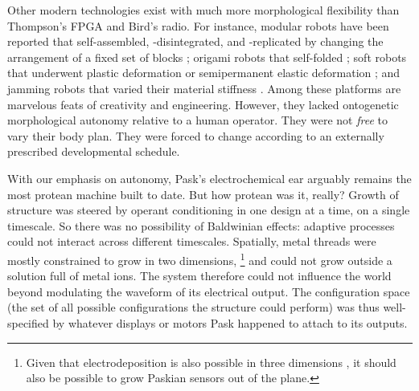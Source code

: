 Other modern technologies exist with much more 
morphological
flexibility
than Thompson's FPGA and Bird's radio.
For instance,
modular robots have been reported that self-assembled, -disintegrated, and -replicated by changing the arrangement of a fixed set of blocks \cite{zykov2005robotics,romanishin20153d,li2019particle,white2005three};
origami robots that self-folded
\cite{hawkes2010programmable,felton2014method,miyashita2017robotic,gladman2016biomimetic};
soft robots that underwent plastic deformation or semipermanent elastic deformation
\cite{shepherd2011multigait,shah2019morphing,shah2020gaining};
and jamming robots that varied their material stiffness \cite{brown2010universal,narang2018transforming,steltz2009jsel}.
Among these platforms are marvelous feats of creativity and engineering.
However, they lacked ontogenetic morphological autonomy relative to a human operator.
They were not \textit{free} to vary their body plan.
They were forced to change according to an externally prescribed developmental schedule.




With our emphasis on autonomy,
Pask's electrochemical ear 
arguably remains the most protean machine built to date.
But how protean was it, really?
Growth of structure was steered by operant conditioning in one design at a time, on a single timescale.
So there was no possibility of Baldwinian effects: adaptive processes could not interact across different timescales.
Spatially,
metal threads were mostly constrained to grow 
in two dimensions,%
\footnote{%
Given that electrodeposition is also possible in three dimensions \cite{madden1995fabrication}, it should also be possible to grow Paskian sensors out of the plane.
}
and could not grow outside a solution full of metal ions.
The system therefore could not influence the world beyond modulating the waveform of its electrical output.
The 
configuration space
(the set of all possible 
configurations
the structure could perform)
was thus well-specified by whatever displays or motors Pask happened to attach to its outputs.

